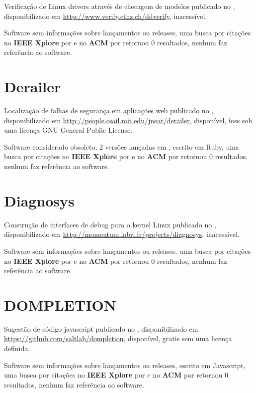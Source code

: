 Verificação de Linux drivers através de checagem de modelos
publicado no  ,
disponibilizado em \url{http://www.verify.ethz.ch/ddverify},
inacessível.

Software sem informações sobre lançamentos ou releases,
uma busca por citações no {\bf IEEE Xplore} por
\texttt{}
e no {\bf ACM} por
\texttt{}
retornou
0 resultados,
nenhum faz referência ao software.



\section{Derailer}

Localização de falhas de segurança em aplicações web
publicado no  ,
disponibilizado em \url{http://people.csail.mit.edu/jnear/derailer},
disponível,
foss
sob uma licença GNU General Public License.

Software considerado obsoleto,
2 versões lançadas
em ,
escrito em Ruby,
uma busca por citações no {\bf IEEE Xplore} por
\texttt{}
e no {\bf ACM} por
\texttt{}
retornou
0 resultados,
nenhum faz referência ao software.



\section{Diagnosys}

Construção de interfaces de debug para o kernel Linux
publicado no  ,
disponibilizado em \url{http://momentum.labri.fr/projects/diagnosys},
inacessível.

Software sem informações sobre lançamentos ou releases,
uma busca por citações no {\bf IEEE Xplore} por
\texttt{}
e no {\bf ACM} por
\texttt{}
retornou
0 resultados,
nenhum faz referência ao software.



\section{DOMPLETION}

Sugestão de código javascript
publicado no  ,
disponibilizado em \url{https://github.com/saltlab/dompletion},
disponível,
gratis
sem uma licença definida.

Software sem informações sobre lançamentos ou releases,
escrito em Javascript,
uma busca por citações no {\bf IEEE Xplore} por
\texttt{}
e no {\bf ACM} por
\texttt{}
retornou
0 resultados,
nenhum faz referência ao software.



